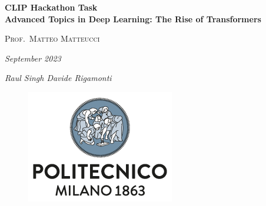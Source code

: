 

\begin{titlepage}
    \centering
    \vspace{1em}
    
    {\Huge\bfseries CLIP Hackathon Task \\ \normalsize\bfseries Advanced Topics in Deep Learning: The Rise of Transformers}
    
    \vspace{4em}
    
    {\large\scshape Prof.~Matteo Matteucci\par} 
    
    \vspace{3em}
    
    {\large\slshape September 2023 \par}
    
    \vspace{3em}
    
    \begin{multicols}{2}
        \large\itshape
        Raul Singh 
        \vfill\null\columnbreak
        Davide Rigamonti
    \end{multicols}
    
    \vfill
    
    \begin{figure}[b]
        \includegraphics[scale=0.6]{img/polimi.png} 
        \centering
    \end{figure}
\end{titlepage}
